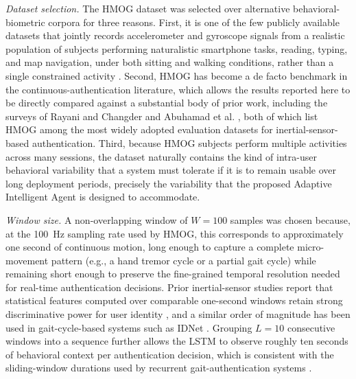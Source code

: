 \documentclass[3p,times,procedia]{elsarticle}
\begin{document}
\textit{Dataset selection.} The HMOG dataset was selected over
alternative behavioral-biometric corpora for three reasons.
First, it is one of the few publicly available datasets that
jointly records accelerometer and gyroscope signals from a
realistic population of subjects performing naturalistic
smartphone tasks, reading, typing, and map navigation, under
both sitting and walking conditions, rather than a single
constrained activity \cite{sitova_hmog_2016}. Second, HMOG has
become a de facto benchmark in the continuous-authentication
literature, which allows the results reported here to be
directly compared against a substantial body of prior work,
including the surveys of Rayani and Changder
\cite{rayani_continuous_2023} and Abuhamad et al.
\cite{abuhamad_sensorbased_2021}, both of which list HMOG among
the most widely adopted evaluation datasets for
inertial-sensor-based authentication. Third, because HMOG
subjects perform multiple activities across many sessions, the
dataset naturally contains the kind of intra-user behavioral
variability that a system must tolerate if it is to remain
usable over long deployment periods, precisely the variability
that the proposed Adaptive Intelligent Agent is designed to
accommodate.

\textit{Window size.} A non-overlapping window of $W = 100$
samples was chosen because, at the 100~Hz sampling rate used by
HMOG, this corresponds to approximately one second of
continuous motion, long enough to capture a complete
micro-movement pattern (e.g., a hand tremor cycle or a partial
gait cycle) while remaining short enough to preserve the
fine-grained temporal resolution needed for real-time
authentication decisions. Prior inertial-sensor studies report
that statistical features computed over comparable one-second
windows retain strong discriminative power for user identity
\cite{shen_performance_2018}, and a similar order of magnitude
has been used in gait-cycle-based systems such as IDNet
\cite{gadaleta_idnet_2018}. Grouping $L = 10$ consecutive
windows into a sequence further allows the LSTM to observe
roughly ten seconds of behavioral context per authentication
decision, which is consistent with the sliding-window
durations used by recurrent gait-authentication systems
\cite{giorgi_using_2021,zou_deep_2020}.
\end{document}
